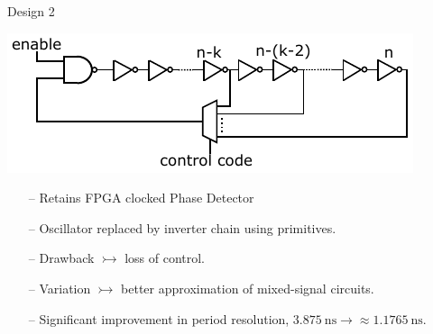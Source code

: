 \documentclass{beamer}
\begin{document}
\begin{frame}{Design 2}
	\vspace{-0.67 cm}	
	\begin{center}
		\includegraphics[width=0.8\linewidth]{../ro_new}
	\end{center}
	\vspace{-0.37 cm}
		\begin{itemize}
			\item[--]
				Retains FPGA clocked Phase Detector
			\item[--]
				Oscillator replaced by inverter chain using primitives.
			\item[--]
				Drawback $\rightarrowtail$ loss of control.
			\item[--]
				 Variation $\rightarrowtail$ better approximation of mixed-signal circuits.
			\item[--]
				Significant improvement in period resolution, $3.875~\si{\nano\second}\rightarrow \approx 1.1765~\si{\nano\second}$.
		\end{itemize}
\end{frame}
\end{document}
